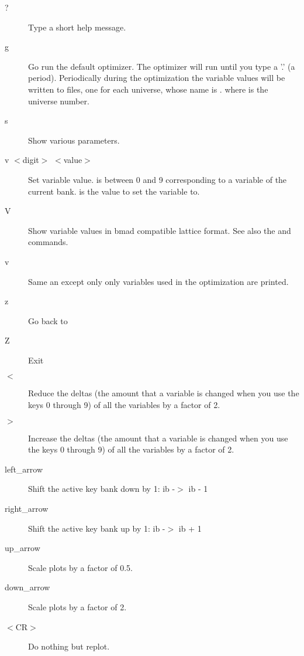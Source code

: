 \begin{description}
\item[?]
Type a short help message.

\item[g]
Go run the default optimizer. The optimizer will run until you type a
'.' (a period).  Periodically during the optimization the variable
values will be written to files, one for each universe, whose name is
. where \vn{\#} is the universe number.

\item[s]  
Show various parameters.

\item[v $<$digit$>$ $<$value$>$]
Set variable value.  is between 0 and 9 corresponding to a
variable of the current bank.  is the value to set the
variable to.

\item[V]
Show variable values in bmad compatible lattice format. See also the
 and  commands.

\item[\W v] 
Same an  except only only variables used in the optimization are printed.
\item[z] 
Go back to 

\item[Z] 
Exit \tao
                                        
\item[$<$]
Reduce the deltas (the amount that a variable is changed when you use
the keys 0 through 9) of all the variables by a factor of 2.

\item[$>$]
Increase the deltas (the amount that a variable is changed when you
use the keys 0 through 9) of all the variables by a factor of 2.

\item[left\_arrow]
Shift the active key bank down by 1: ib -$>$ ib - 1

\item[right\_arrow]
Shift the active key bank up by 1: ib -$>$ ib + 1

\item[up\_arrow]
Scale plots by a factor of 0.5.

\item[down\_arrow]
Scale plots by a factor of 2.

\item[$<$CR$>$]
Do nothing but replot.


\end{description}
